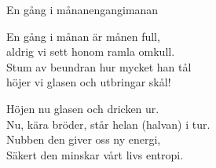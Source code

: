 \begin{song}{En gång i månan}{engangimanan}
\begin{vers}
En gång i månan är månen full,\\
aldrig vi sett honom ramla omkull.\\
Stum av beundran hur mycket han tål\\
höjer vi glasen och utbringar skål!\\
\end{vers}
\begin{vers}
Höjen nu glasen och dricken ur.\\
Nu, kära bröder, står helan (halvan) i tur.\\
Nubben den giver oss ny energi,\\
Säkert den minskar vårt livs entropi.\\
\end{vers}
\end{song}

